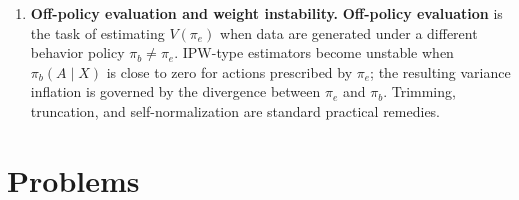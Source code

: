 \documentclass[master.tex]{subfiles}
\begin{document}
\begin{enumerate}
  \item \textbf{Off-policy evaluation and weight instability.}
    \textbf{Off-policy evaluation} is the task of estimating $V(\pi_e)$ when
    data are generated under a different behavior policy $\pi_b\neq\pi_e$.
    IPW-type estimators become unstable when $\pi_b(A\mid X)$ is close to zero
    for actions prescribed by $\pi_e$; the resulting variance inflation is
    governed by the divergence between $\pi_e$ and $\pi_b$.  Trimming,
    truncation, and self-normalization are standard practical remedies.

\end{enumerate}

\section*{Problems}
\end{document}

